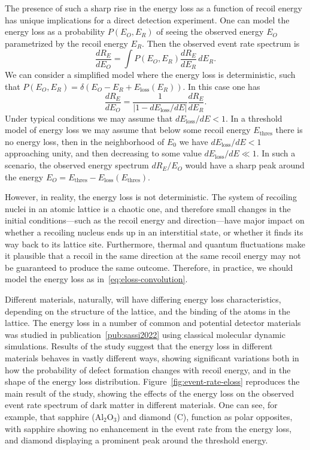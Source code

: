 \documentclass[b5paper, 10pt, twoside]{book}
\newcommand{\der}[2]{\frac{d#1}{d#2}}
\newcommand{\difd}{\,d}
\begin{document}
The presence of such a sharp rise in the energy loss as a function of recoil energy has unique implications for a direct detection experiment. One can model the energy loss as a probability $P(E_O,E_R)$ of seeing the observed energy $E_O$ parametrized by the recoil energy $E_R$. Then the observed event rate spectrum is
\begin{equation}
\der{R_E}{E_O}=\int P(E_O,E_R)\der{R_E}{E_R}\difd E_R.
\label{eq:eloss-convolution}
\end{equation}
We can consider a simplified model where the energy loss is deterministic, such that $P(E_O,E_R)=\delta(E_O-E_R+E_\text{loss}(E_R))$. In this case one has
\begin{equation}
\der{R_E}{E_O}=\frac{1}{|1-dE_\text{loss}/dE|}\der{R_E}{E_R}.
\end{equation}
Under typical conditions we may assume that $dE_\text{loss}/dE<1$. In a threshold model of energy loss we may assume that below some recoil energy $E_\text{thres}$ there is no energy loss, then in the neighborhood of $E_0$ we have $dE_\text{loss}/dE<1$ approaching unity, and then decreasing to some value $dE_\text{loss}/dE\ll1$. In such a scenario, the observed energy spectrum $dR_E/E_O$ would have a sharp peak around the energy $E_O=E_\text{thres}-E_\text{loss}(E_\text{thres})$.

However, in reality, the energy loss is not deterministic. The system of recoiling nuclei in an atomic lattice is a chaotic one, and therefore small changes in the initial conditions---such as the recoil energy and direction---have major impact on whether a recoiling nucleus ends up in an interstitial state, or whether it finds its way back to its lattice site. Furthermore, thermal and quantum fluctuations make it plausible that a recoil in the same direction at the same recoil energy may not be guaranteed to produce the same outcome. Therefore, in practice, we should model the energy loss as in~\eqref{eq:eloss-convolution}.

Different materials, naturally, will have differing energy loss characteristics, depending on the structure of the lattice, and the binding of the atoms in the lattice. The energy loss in a number of common and potential detector materials was studied in publication~\ref{pub:sassi2022} using classical molecular dynamic simulations. Results of the study suggest that the energy loss in different materials behaves in vastly different ways, showing significant variations both in how the probability of defect formation changes with recoil energy, and in the shape of the energy loss distribution. Figure~\ref{fig:event-rate-eloss} reproduces the main result of the study, showing the effects of the energy loss on the observed event rate spectrum of dark matter in different materials. One can see, for example, that sapphire ($\text{Al}_2\text{O}_3$) and diamond (C), function as polar opposites, with sapphire showing no enhancement in the event rate from the energy loss, and diamond displaying a prominent peak around the threshold energy.
\end{document}
